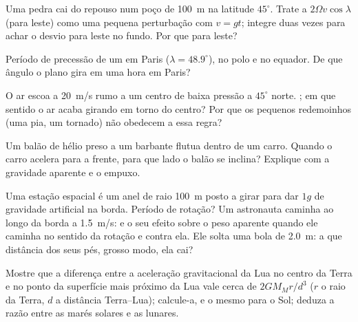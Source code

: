 \begin{exercise}[$\star\star$]\label{exo:b1:non-inertial-frames:7}
Uma pedra cai do repouso num poço de \qty{100}{m} na latitude $45^\circ$.
Trate a  $2\Omega v\cos\lambda$ (para leste) como uma
pequena perturbação com $v = gt$; integre duas vezes para achar o desvio
para leste no fundo. Por que para leste?
\end{exercise}

\begin{exercise}[$\star\star$]\label{exo:b1:non-inertial-frames:8}
Período de precessão de um  em Paris ($\lambda = 48.9^\circ$),
no polo e no equador. De que ângulo o plano gira em uma hora
em Paris?
\end{exercise}

\begin{exercise}[$\star\star$]\label{exo:b1:non-inertial-frames:9}
O ar escoa a \qty{20}{m/s} rumo a um centro de baixa pressão a $45^\circ$
norte. ; em que sentido o ar acaba girando em torno
do centro? Por que os pequenos redemoinhos (uma pia, um tornado) não
obedecem a essa regra?
\end{exercise}

\begin{exercise}[$\star\star\star$]\label{exo:b1:non-inertial-frames:10}
Um balão de hélio preso a um barbante flutua dentro de um carro. Quando o
carro acelera para a frente, para que lado o balão se inclina? Explique com
a gravidade aparente e o empuxo.
\end{exercise}

\begin{exercise}[$\star\star\star$]\label{exo:b1:non-inertial-frames:11}
Uma estação espacial é um anel de raio \qty{100}{m} posto a girar para dar
$1g$ de gravidade artificial na borda. Período de rotação? Um astronauta
caminha ao longo da borda a \qty{1.5}{m/s}:  e o seu
efeito sobre o peso aparente quando ele caminha no sentido da rotação e
contra ela. Ele solta uma bola de \qty{2.0}{m}: a que distância dos seus
pés, grosso modo, ela cai?
\end{exercise}

\begin{exercise}[$\star\star\star$]\label{exo:b1:non-inertial-frames:12}
Mostre que a diferença entre a aceleração gravitacional da Lua no centro da
Terra e no ponto da superfície mais próximo da Lua vale cerca de
$2GM_Mr/d^3$ ($r$ o raio da Terra, $d$ a distância Terra--Lua);
calcule-a, e o mesmo para o Sol; deduza a razão entre as marés solares e as
lunares.
\end{exercise}

